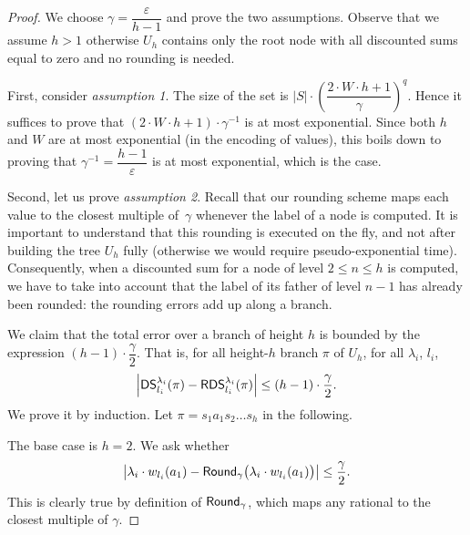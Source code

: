 \documentclass{llncs}
\newcommand{\states}{\ensuremath{S} }
\newcommand{\weight}{\ensuremath{w} }
\newcommand{\discSum}[1]{\ensuremath{{\sf DS}^{#1}} }
\newcommand{\discount}{\ensuremath{\lambda} }
\newcommand{\round}{\ensuremath{{\sf Round}_{\gamma}} }
\newcommand{\roundedDiscSum}[1]{\ensuremath{{\sf RDS}^{#1}} }
\begin{document}
\begin{proof}
We choose $\gamma = \dfrac{\varepsilon}{h-1}$ and prove the two assumptions. Observe that we assume $h > 1$ otherwise $U_{h}$ contains only the root node with all discounted sums equal to zero and no rounding is needed.

First, consider \textit{assumption 1}. The size of the set is $\vert \states \vert \cdot \left(\dfrac{2\cdot W \cdot h + 1}{\gamma} \right) ^{q}$.
Hence it suffices to prove that $\left(2\cdot W \cdot h + 1\right) \cdot \gamma^{-1}$ is at most exponential. Since both $h$ and $W$ are at most exponential (in the encoding of values), this boils down to proving that $\gamma^{-1} = \dfrac{h-1}{\varepsilon}$ is at most exponential, which is the case.

Second, let us prove \textit{assumption 2}. Recall that our rounding scheme maps each value to the closest multiple of~$\gamma$ whenever the label of a node is computed. It is important to understand that this rounding is executed on the fly, and not after building the tree $U_{h}$ fully (otherwise we would require pseudo-exponential time). Consequently, when a discounted sum for a node of level $2 \leq n \leq h$ is computed, we have to take into account that the label of its father of level $n-1$ has already been rounded: the rounding errors add up along a branch.

We claim that the total error over a branch of height $h$ is bounded by the expression $(h-1)\cdot \dfrac{\gamma}{2}$. That is, for all height-$h$ branch $\pi$ of $U_{h}$, for all $\discount_{i}$, $l_{i}$,
\begin{equation*}
\left\vert \discSum{\discount_{i}}_{l_{i}}(\pi) - \roundedDiscSum{\discount_{i}}_{l_{i}}(\pi) \right\vert \leq (h-1) \cdot \dfrac{\gamma}{2}.
\end{equation*}
We prove it by induction. Let $\pi = s_{1}a_{1}s_{2}\ldots{}s_{h}$ in the following.

The base case is $h = 2$. We ask whether
\begin{equation*}
\left\vert \discount_{i} \cdot \weight_{l_{i}}(a_{1}) - \round\big(\discount_{i} \cdot \weight_{l_{i}}(a_{1})\big) \right\vert \leq \dfrac{\gamma}{2}.
\end{equation*}
This is clearly true by definition of $\round$, which maps any rational to the closest multiple of $\gamma$.


\end{proof}
\end{document}
